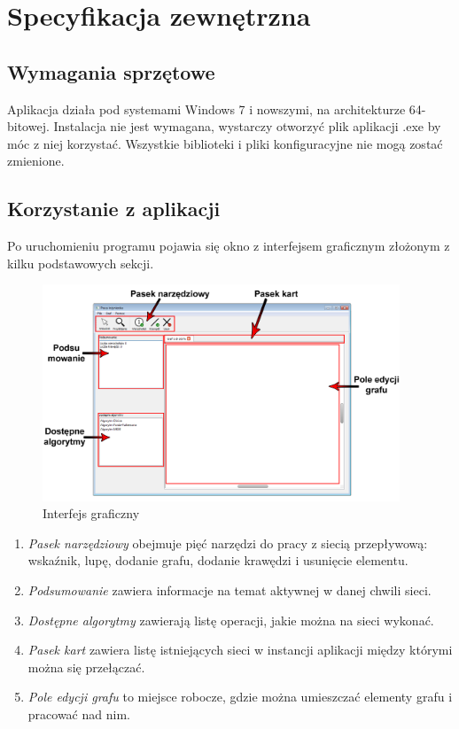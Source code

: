 \chapter{Specyfikacja zewnętrzna}
\section{Wymagania sprzętowe}
Aplikacja działa pod systemami Windows 7 i nowszymi, na architekturze 64-bitowej. Instalacja nie jest wymagana, wystarczy otworzyć plik aplikacji .exe by móc z niej korzystać. Wszystkie biblioteki i pliki konfiguracyjne nie mogą zostać zmienione.
\section{Korzystanie z aplikacji}
Po uruchomieniu programu pojawia się okno z interfejsem graficznym złożonym z kilku podstawowych sekcji.
\begin{figure}[H]
	\centering
	\includegraphics[width=0.95\textwidth]{./img/spec_zew01.png}
	\caption{Interfejs graficzny}
\end{figure}
\begin{enumerate}
	\item \textit{Pasek narzędziowy} obejmuje pięć narzędzi do pracy z siecią przepływową: wskaźnik, lupę, dodanie grafu, dodanie krawędzi i usunięcie elementu.
	\item \textit{Podsumowanie} zawiera informacje na temat aktywnej w danej chwili sieci.
	\item \textit{Dostępne algorytmy} zawierają listę operacji, jakie można na sieci wykonać.
	\item \textit{Pasek kart} zawiera listę istniejących sieci w instancji aplikacji między którymi można się przełączać.
	\item \textit{Pole edycji grafu} to miejsce robocze, gdzie można umieszczać elementy grafu i pracować nad nim.
\end{enumerate}
